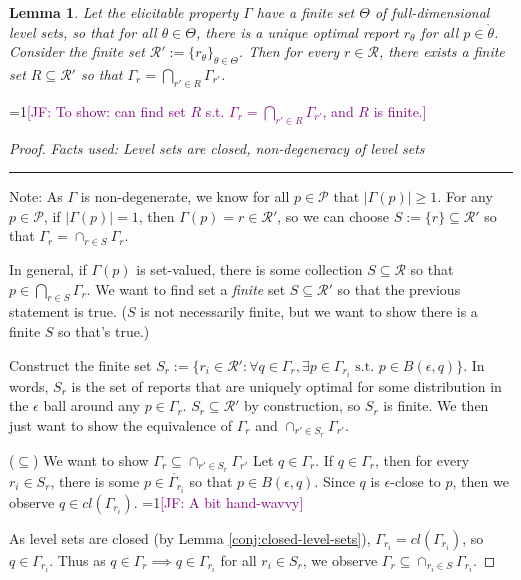 \documentclass[12pt]{article}
\newcommand{\Comments}{1}
\newcommand{\mynote}[2]{\ifnum\Comments=1\textcolor{#1}{#2}\fi}
\newcommand{\jessie}[1]{\mynote{purple}{[JF: #1]}}
\renewcommand{\P}{\mathcal{P}}
\newcommand{\R}{\mathcal{R}}
\newcommand{\inter}[1]{\mathring{#1}}%
\newtheorem{lemma}{Lemma}
\begin{document}
\begin{lemma}\label{lem:intersect-lev-sets}
  Let the elicitable property $\Gamma$ have a finite set $\Theta$ of full-dimensional level sets, so that for all $\theta \in \Theta$,  there is a unique optimal report $r_\theta$ for all $p \in \inter{\theta}$.
  Consider the finite set $\R' := \{ r_\theta\}_{\theta \in \Theta}$.
  Then for every $r \in \R$, there exists a finite set $R \subseteq \R'$ so that $\Gamma_r = \bigcap_{r' \in R} \Gamma_{r'}$.
\end{lemma}
\jessie{To show: can find set $R$ s.t. $\Gamma_r = \bigcap_{r' \in R} \Gamma_{r'}$, and $R$ is finite.}
\begin{proof}
  \emph{Facts used: Level sets are closed, non-degeneracy of level sets}\\

\hrule
\bigskip
  Note:    As $\Gamma$ is non-degenerate, we know for all $p \in \P$ that $|\Gamma(p)| \geq 1$.
  For any $p \in \P$, if $|\Gamma(p)| = 1$, then $\Gamma(p) = r \in \R'$, so we can choose $S := \{r\} \subseteq \R'$ so that $\Gamma_r = \cap_{r \in S} \Gamma_r$.
  
  In general, if $\Gamma(p)$ is set-valued, there is some collection $S \subseteq \R$ so that $p \in \bigcap_{r \in S} \Gamma_r$.
  We want to find set a \emph{finite} set $S \subseteq \R'$ so that the previous statement is true.
  ($S$ is not necessarily finite, but we want to show there is a finite $S$ so that's true.)

Construct the finite set $S_r := \{ r_i \in \R' : \forall q \in \Gamma_{r}, \exists p \in \Gamma_{r_i} \text{ s.t. } p \in B(\epsilon, q) \}$.
In words, $S_r$ is the set of reports that are uniquely optimal for some distribution in the $\epsilon$ ball around any $p \in \Gamma_r$.
$S_r \subseteq \R'$ by construction, so $S_r$ is finite. 
We then just want to show the equivalence of $\Gamma_r$ and $\cap_{r' \in S_r}\Gamma_{r'}$.

($\subseteq$)  We want to show $\Gamma_r \subseteq \cap_{r' \in S_r}\Gamma_{r'}$
Let $q \in \Gamma_r$.
If $q \in \Gamma_r$, then for every $r_i \in S_r$, there is some $p \in \inter{\Gamma_{r_i}}$ so that $p \in B(\epsilon, q)$.
Since $q$ is $\epsilon$-close to $p$, then we observe $q \in cl(\Gamma_{r_i})$.
\jessie{A bit hand-wavvy}

As level sets are closed (by Lemma \ref{conj:closed-level-sets}), $\Gamma_{r_i} = cl(\Gamma_{r_i})$, so $q \in \Gamma_{r_i}$.
Thus as $q \in \Gamma_r \implies q \in \Gamma_{r_i}$ for all $r_i \in S_r$, we observe $\Gamma_r \subseteq \cap_{r_i \in S}\Gamma_{r_i}$.


\end{proof}
\end{document}
